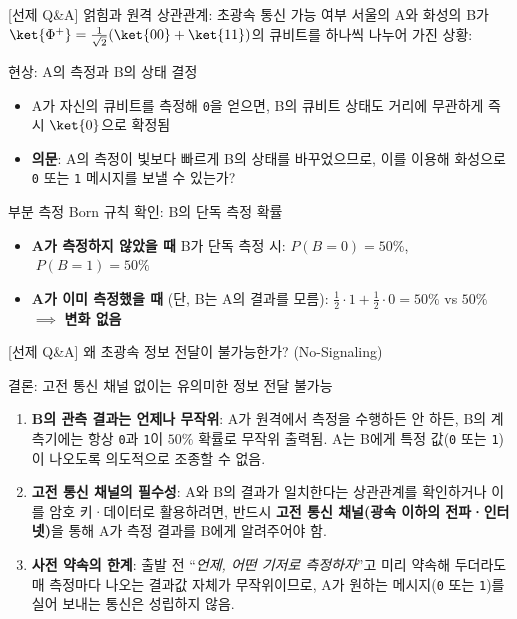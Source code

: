 \documentclass[aspectratio=169, 10pt]{beamer}
\begin{document}
\begin{frame}{[선제 Q\&A] 얽힘과 원격 상관관계: 초광속 통신 가능 여부}
    서울의 A와 화성의 B가 $\ket{\Phi^+} = \frac{1}{\sqrt{2}}(\ket{00}+\ket{11})$의 큐비트를 하나씩 나누어 가진 상황:
    \vspace{0.1cm}
    \begin{qcblock}{현상: A의 측정과 B의 상태 결정}
        \begin{itemize}
            \item A가 자신의 큐비트를 측정해 \texttt{0}을 얻으면, B의 큐비트 상태도 거리에 무관하게 즉시 $\ket{0}$으로 확정됨
            \pause
            \item \textbf{의문}: A의 측정이 빛보다 빠르게 B의 상태를 바꾸었으므로, 이를 이용해 화성으로 \texttt{0} 또는 \texttt{1} 메시지를 보낼 수 있는가?
        \end{itemize}
    \end{qcblock}
    \pause
    \vspace{0.1cm}
    \begin{qctip}{부분 측정 Born 규칙 확인: B의 단독 측정 확률}
        \begin{itemize}
            \item \textbf{A가 측정하지 않았을 때} B가 단독 측정 시: $P(B=0) = 50\%$, $\; P(B=1) = 50\%$
            \pause
            \item \textbf{A가 이미 측정했을 때} (단, B는 A의 결과를 모름): $\frac{1}{2}\cdot 1 + \frac{1}{2}\cdot 0 = 50\%$ vs $50\%$ $\implies$ \textbf{변화 없음}
        \end{itemize}
    \end{qctip}
\end{frame}

\begin{frame}{[선제 Q\&A] 왜 초광속 정보 전달이 불가능한가? (No-Signaling)}
    \begin{qcalert}{결론: 고전 통신 채널 없이는 유의미한 정보 전달 불가능}
        \begin{enumerate}
            \item \textbf{B의 관측 결과는 언제나 무작위}:
            A가 원격에서 측정을 수행하든 안 하든, B의 계측기에는 항상 \texttt{0}과 \texttt{1}이 $50\%$ 확률로 무작위 출력됨. A는 B에게 특정 값(\texttt{0} 또는 \texttt{1})이 나오도록 의도적으로 조종할 수 없음.\pause
            \item \textbf{고전 통신 채널의 필수성}:
            A와 B의 결과가 일치한다는 상관관계를 확인하거나 이를 암호 키·데이터로 활용하려면, 반드시 \textbf{고전 통신 채널(광속 이하의 전파·인터넷)}을 통해 A가 측정 결과를 B에게 알려주어야 함.\pause
            \item \textbf{사전 약속의 한계}:
            출발 전 ``\textit{언제, 어떤 기저로 측정하자}''고 미리 약속해 두더라도 매 측정마다 나오는 결과값 자체가 무작위이므로, A가 원하는 메시지(\texttt{0} 또는 \texttt{1})를 실어 보내는 통신은 성립하지 않음.
        \end{enumerate}
    \end{qcalert}
\end{frame}
\end{document}
